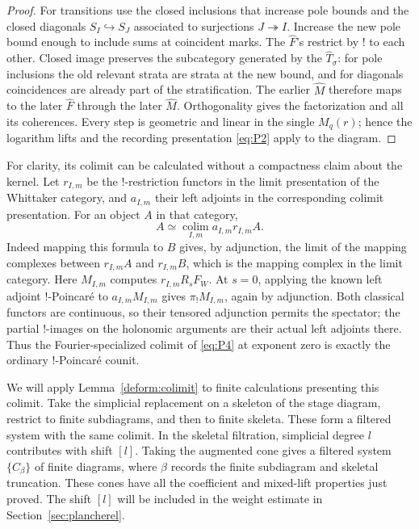 \documentclass[11pt]{article}
\numberwithin{equation}{section}
\theoremstyle{definition}
\theoremstyle{remark}
\begin{document}
\begin{proof}
For transitions use the closed inclusions that increase pole
bounds and the closed diagonals $S_I\hookrightarrow S_J$
associated to surjections $J\twoheadrightarrow I$.  Increase
the new pole bound enough to include sums at coincident marks.
The $\widehat F$'s restrict by $!$ to each other.  Closed image
preserves the subcategory generated by the
$\widehat T_\sigma$: for pole inclusions the old relevant strata
are strata at the new bound, and for diagonals coincidences
are already part of the stratification.  The earlier
$\widehat M$ therefore maps to the later $\widehat F$ through
the later $\widehat M$.  Orthogonality gives the factorization
and all its coherences.  Every step is geometric and linear
in the single $M_q(r)$; hence the logarithm lifts and the
recording presentation \eqref{eq:P2} apply to the diagram.
\end{proof}

For clarity, its colimit can be calculated without a compactness
claim about the kernel.  Let $r_{I,m}$ be the $!$-restriction
functors in the limit presentation of the Whittaker category,
and $a_{I,m}$ their left adjoints in the corresponding colimit
presentation.  For an object $A$ in that category,
\[
                A\simeq\operatorname*{colim}_{I,m}
                                  a_{I,m}r_{I,m}A.
\]
Indeed mapping this formula to $B$ gives, by adjunction, the
limit of the mapping complexes between $r_{I,m}A$ and
$r_{I,m}B$, which is the mapping complex in the limit category.
Here $M_{I,m}$ computes $r_{I,m}R_sF_W$.  At $s=0$, applying
the known left adjoint $!$-Poincar\'e to
$a_{I,m}M_{I,m}$ gives $\pi_!M_{I,m}$, again by adjunction.
Both classical functors are continuous, so their tensored
adjunction permits the spectator; the partial $!$-images on
the holonomic arguments are their actual left adjoints there.
Thus the Fourier-specialized colimit of \eqref{eq:P4} at
exponent zero is exactly the ordinary $!$-Poincar\'e counit.

We will apply Lemma~\ref{deform:colimit} to finite calculations
presenting this colimit.  Take the simplicial replacement on a
skeleton of the stage diagram, restrict to finite subdiagrams,
and then to finite skeleta.  These form a filtered system with
the same colimit.  In the skeletal filtration, simplicial
degree $l$ contributes with shift $[l]$.  Taking the augmented
cone gives a filtered system $\{\widehat C_\beta\}$ of finite diagrams,
where $\beta$ records the finite subdiagram and skeletal truncation.
These cones have all the coefficient and mixed-lift properties just
proved.  The shift $[l]$ will be included in the weight estimate in
Section~\ref{sec:plancherel}.
\end{document}
